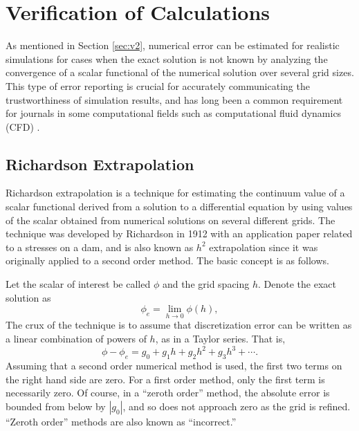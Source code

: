\section{Verification of Calculations}
As mentioned in Section \ref{sec:v2}, numerical error can be estimated for realistic simulations for cases when the exact solution is not known by analyzing the convergence of a scalar functional of the numerical solution over several grid sizes.
This type of error reporting is crucial for accurately communicating the trustworthiness of simulation results, and has long been a common requirement for journals in some computational fields such as computational fluid dynamics (CFD) \cite{roache_editorial_1986}.

\subsection{Richardson Extrapolation}
Richardson extrapolation is a technique for estimating the continuum value of a scalar functional derived from a solution to a differential equation by using values of the scalar obtained from numerical solutions on several different grids.
The technique was developed by Richardson in 1912 with an application paper related to a stresses on a dam, and is also known as $h^2$ extrapolation since it was originally applied to a second order method.
The basic concept is as follows.

Let the scalar of interest be called $\phi$ and the grid spacing $h$.
Denote the exact solution as
\begin{equation}
  \phi_e = \lim_{h \to 0} \phi(h),
\end{equation}
The crux of the technique is to assume that discretization error can be written as a linear combination of powers of $h$, as in a Taylor series.
That is,
\begin{equation}
  \phi - \phi_e = g_0 + g_1 h + g_2 h^2 + g_3 h^3 + \cdots.
\end{equation}
Assuming that a second order numerical method is used, the first two terms on the right hand side are zero.
For a first order method, only the first term is necessarily zero.
Of course, in a ``zeroth order'' method, the absolute error is bounded from below by $|g_0|$, and so does not approach zero as the grid is refined.
``Zeroth order'' methods are also known as ``incorrect.''

